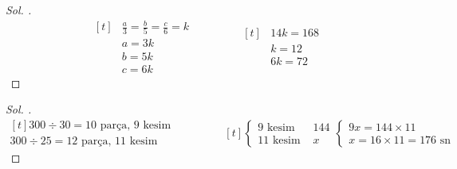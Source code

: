\documentclass{article}
\theoremstyle{mytheoremstyle}
\theoremstyle{mytheoremstyle}
\theoremstyle{myproblemstyle}
\begin{document}
\begin{problem}[Eli, Derya ve Elif; 168 TL'yi sırasıyla $ 3, 5, 6 $ ile orantılı şekilde paylaşıyorlar. Elif = ?]
\end{problem}

\begin{proof}[\textit{ Sol. }]
  \begin{equation*}
    \begin{aligned}[t]
      &\frac{a}{3} = \frac{b}{5} = \frac{c}{6} = k\\
      &a = 3k\\
      &b = 5k\\
      &c = 6k
    \end{aligned}
    \qquad\qquad
    \begin{aligned}[t]
      &14k = 168\\
      &k = 12\\
      &6k = 72
    \end{aligned}
  \end{equation*}
\end{proof}

\begin{problem}
\end{problem}

\begin{proof}[\textit{ Sol. }]
  \begin{equation*}
    \begin{aligned}[t]
      300 \div 30 = 10 \text{ parça, 9 kesim}\\
      300 \div 25 = 12 \text{ parça, 11 kesim}
    \end{aligned}
    \qquad\qquad
    \begin{aligned}[t]
      \begin{cases}
        9 \text{ kesim } &144\\
        11 \text{ kesim } &x
      \end{cases}
      \begin{cases}
        9x = 144 \times 11\\
        x = 16 \times 11 = 176 \text{ sn}
      \end{cases}
    \end{aligned}
  \end{equation*}
\end{proof}

\begin{problem}
\end{problem}
\end{document}
